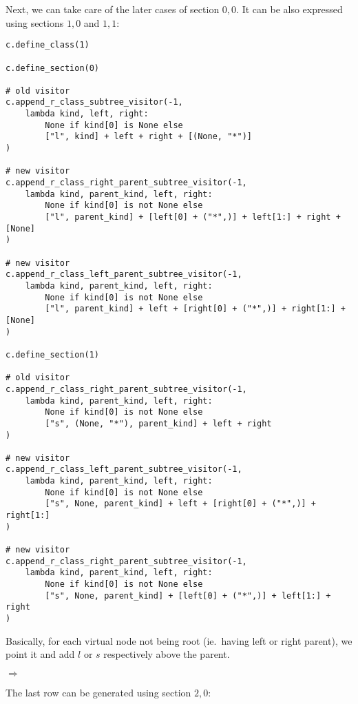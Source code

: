 \documentclass[final]{article}
\theoremstyle{definition}
\theoremstyle{remark}
\newcommand{\includeinlinesvg}[2]{\begin{minipage}{#1\textwidth}\end{minipage}}
\begin{document}
Next, we can take care of the later cases of section \(0, 0\). It can be also expressed using sections \(1, 0\) and \(1, 1\):

\begin{lstlisting}
c.define_class(1)

c.define_section(0)

# old visitor
c.append_r_class_subtree_visitor(-1,
    lambda kind, left, right:
        None if kind[0] is None else
        ["l", kind] + left + right + [(None, "*")]
)

# new visitor
c.append_r_class_right_parent_subtree_visitor(-1,
    lambda kind, parent_kind, left, right:
        None if kind[0] is not None else
        ["l", parent_kind] + [left[0] + ("*",)] + left[1:] + right + [None]
)

# new visitor
c.append_r_class_left_parent_subtree_visitor(-1,
    lambda kind, parent_kind, left, right:
        None if kind[0] is not None else
        ["l", parent_kind] + left + [right[0] + ("*",)] + right[1:] + [None]
)

c.define_section(1)

# old visitor
c.append_r_class_right_parent_subtree_visitor(-1,
    lambda kind, parent_kind, left, right:
        None if kind[0] is not None else
        ["s", (None, "*"), parent_kind] + left + right
)

# new visitor
c.append_r_class_left_parent_subtree_visitor(-1,
    lambda kind, parent_kind, left, right:
        None if kind[0] is not None else
        ["s", None, parent_kind] + left + [right[0] + ("*",)] + right[1:]
)

# new visitor
c.append_r_class_right_parent_subtree_visitor(-1,
    lambda kind, parent_kind, left, right:
        None if kind[0] is not None else
        ["s", None, parent_kind] + [left[0] + ("*",)] + left[1:] + right
)
\end{lstlisting}

Basically, for each virtual node not being root (ie.\ having left or right parent), we point it and add \(l\) or \(s\) respectively above the parent.

\includeinlinesvg{.32}{lambda__trees_111__1_base}%
\(\Rightarrow\)
\includeinlinesvg{.32}{lambda__trees_101__0}%
\includeinlinesvg{.32}{lambda__trees_112__0}%

The last row can be generated using section \(2, 0\):
\end{document}
